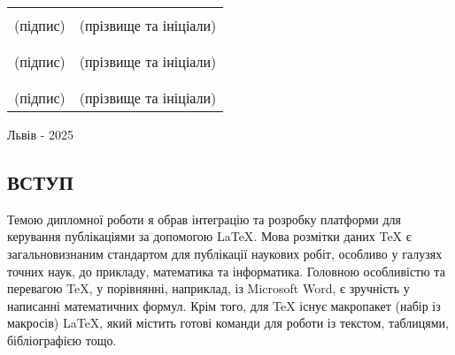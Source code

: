 \documentclass[a4paper,14pt]{extarticle}
\numberwithin{figure}{section}
\begin{document}
\begin{titlepage}
\begin{center}
\begin{spacing}{1}
            \hspace*{8cm}
            \begin{tabular}{p{3cm} p{5cm}}
                \\
                \underline{\hspace{2cm}} & \underline{\hspace{4cm}} \\
                (підпис) & (прізвище та ініціали) \\
                \\
                \underline{\hspace{2cm}} & \underline{\hspace{4cm}} \\
                (підпис) & (прізвище та ініціали) \\
                \\
                \underline{\hspace{2cm}} & \underline{\hspace{4cm}} \\
                (підпис) & (прізвище та ініціали) \\
            \end{tabular}
        \end{spacing}
        \vfill
        \small Львів - 2025
        \end{center}
    \end{titlepage}
    
    \newpage
    \setcounter{page}{2}
    \begin{center}
        \renewcommand{\contentsname}{\large{ЗМІСТ}}
        \tableofcontents
    \end{center}
    
    \newpage
    
    \begin{center}
        \section*{\large ВСТУП}
    \end{center}

    Темою дипломної роботи я обрав інтеграцію та розробку платформи для керування публікаціями за допомогою LaTeX. Мова розмітки даних TeX є загальновизнаним стандартом для публікації наукових робіт, особливо у галузях точних наук, до прикладу, математика та інформатика. Головною особливістю та перевагою TeX, у порівнянні, наприклад, із Microsoft Word, є зручність у написанні математичних формул. Крім того, для TeX існує макропакет (набір із макросів) LaTeX, який містить готові команди для роботи із текстом, таблицями, бібліографією тощо. 
    
\end{document}

